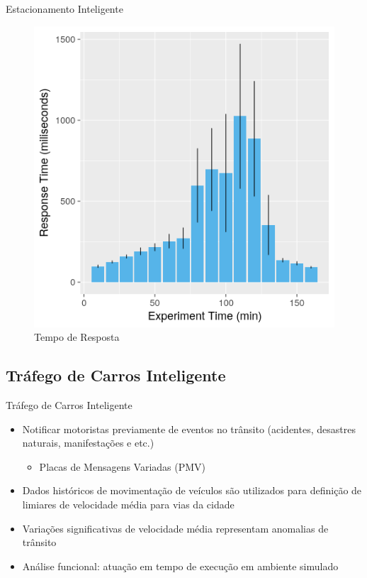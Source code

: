 \documentclass[xcolor={usenames,svgnames,dvipsnames},brazil,english,12pt,aspectratio=149]{beamer}
\begin{document}
\begin{frame}{Estacionamento Inteligente}
     \begin{figure}[ht]
        \centering
        \includegraphics[width=.45\textwidth]{response_time_mean.png}
        \caption{Tempo de Resposta}
    \end{figure}
\end{frame}

\subsection{Tráfego de Carros Inteligente}

\begin{frame}{Tráfego de Carros Inteligente}
    \begin{itemize}
        \item Notificar motoristas previamente de eventos no trânsito (acidentes, desastres naturais, manifestações e etc.)
            \begin{itemize}
                \item Placas de Mensagens Variadas (PMV)
            \end{itemize}
        \item Dados históricos de movimentação de veículos são utilizados para definição de limiares de velocidade média para vias da cidade
        \item Variações significativas de velocidade média representam anomalias de trânsito
        \item Análise funcional: atuação em tempo de execução em ambiente simulado
    \end{itemize}
\end{frame}
\end{document}
